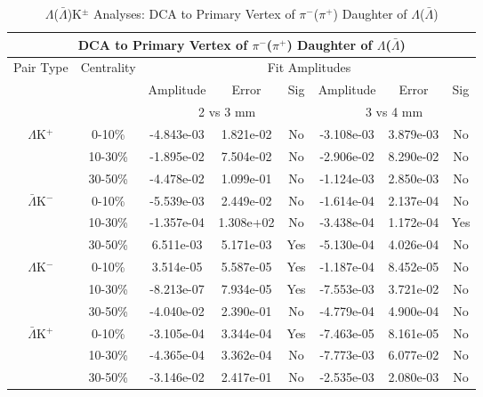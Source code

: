 \documentclass[../AnalysisNoteJBuxton.tex]{subfiles}
\begin{document}
\clearpage



\begin{table}
 \centering
 \begin{tabular}{|c|c|c|c|c||c|c|c|}
  \multicolumn{8}{c}{DCA to Primary Vertex of $\pi^{-}$($\pi^{+}$) Daughter of $\Lambda$($\bar{\Lambda}$)} \\
  \hline
  \multirow{3}{*}{Pair Type} & \multirow{3}{*}{Centrality} & \multicolumn{6}{c|}{Fit Amplitudes} \\
  \cline{3-8}
   & & Amplitude & Error & Sig & Amplitude & Error & Sig \\  
  \cline{3-8}
   & & \multicolumn{3}{c||}{2 vs 3 mm} & \multicolumn{3}{c|}{3 vs 4 mm} \\  
  \hline
  \multirow{3}{*}{$\Lambda$K$^{+}$}
   &  0-10\% & -4.843e-03 & 1.821e-02 & No & -3.108e-03 & 3.879e-03 & No \\
   & 10-30\% & -1.895e-02 & 7.504e-02 & No & -2.906e-02 & 8.290e-02 & No \\
   & 30-50\% & -4.478e-02 & 1.099e-01 & No & -1.124e-03 & 2.850e-03 & No \\
  \hline
  \multirow{3}{*}{$\bar{\Lambda}$K$^{-}$}
   &  0-10\% & -5.539e-03 & 2.449e-02 & No & -1.614e-04 & 2.137e-04 & No \\
   & 10-30\% & -1.357e-04 & 1.308e+02 & No & -3.438e-04 & 1.172e-04 & Yes \\
   & 30-50\% & 6.511e-03 & 5.171e-03 & Yes & -5.130e-04 & 4.026e-04 & No \\
  \hline \hline
  \multirow{3}{*}{$\Lambda$K$^{-}$}
   &  0-10\% & 3.514e-05 & 5.587e-05 & Yes & -1.187e-04 & 8.452e-05 & No \\
   & 10-30\% & -8.213e-07 & 7.934e-05 & Yes & -7.553e-03 & 3.721e-02 & No \\
   & 30-50\% & -4.040e-02 & 2.390e-01 & No & -4.779e-04 & 4.900e-04 & No \\
  \hline
  \multirow{3}{*}{$\bar{\Lambda}$K$^{+}$}
   &  0-10\% & -3.105e-04 & 3.344e-04 & Yes & -7.463e-05 & 8.161e-05 & No \\
   & 10-30\% & -4.365e-04 & 3.362e-04 & No & -7.773e-03 & 6.077e-02 & No \\
   & 30-50\% & -3.146e-02 & 2.417e-01 & No & -2.535e-03 & 2.080e-03 & No \\
  \hline
 \end{tabular}
 \caption{$\Lambda$($\bar{\Lambda}$)K$^{\pm}$ Analyses: DCA to Primary Vertex of $\pi^{-}$($\pi^{+}$) Daughter of $\Lambda$($\bar{\Lambda}$)}
 \label{tab:DcaToPrimVertexPionDaughtOfLamLamKch}
\end{table}
\end{document}
